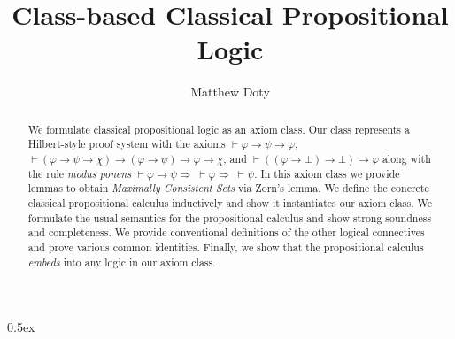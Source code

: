 \documentclass[11pt,a4paper]{report}
\begin{document}
\title{Class-based Classical Propositional Logic}
\author{Matthew Doty}

\maketitle

\begin{abstract}
  We formulate classical propositional logic as an axiom class. Our
  class represents a Hilbert-style proof system with the axioms
  \(\vdash \varphi \to \psi \to \varphi\),
  \(\vdash (\varphi \to \psi \to \chi) \to (\varphi \to \psi) \to
  \varphi \to \chi\), and
  \(\vdash ((\varphi \to \bot) \to \bot) \to \varphi\) along with the
  rule \emph{modus ponens}
  \(\vdash \varphi \to \psi \Longrightarrow \; \vdash \varphi
  \Longrightarrow \; \vdash \psi\). In this axiom class we provide
  lemmas to obtain \emph{Maximally Consistent Sets} via Zorn's lemma.
  We define the concrete classical propositional calculus inductively
  and show it instantiates our axiom class. We formulate the usual
  semantics for the propositional calculus and show strong soundness
  and completeness. We provide conventional definitions of the other
  logical connectives and prove various common identities. Finally, we
  show that the propositional calculus \emph{embeds} into any logic in
  our axiom class.
\end{abstract}

\tableofcontents

\newpage

\parindent 0pt\parskip 0.5ex





\end{document}
